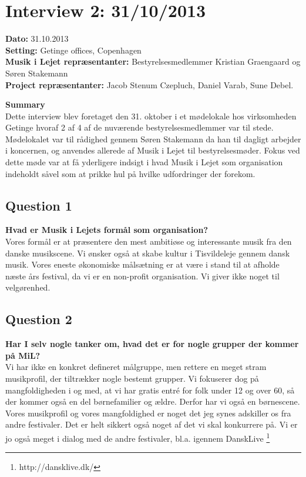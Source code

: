 \section{Interview 2: 31/10/2013}
\label{interview_2}

\textbf{Dato:} 31.10.2013 \\
\textbf{Setting:} Getinge offices, Copenhagen \\
\textbf{Musik i Lejet repræsentanter:} Bestyrelsesmedlemmer Kristian Graengaard og Søren Stakemann \\
\textbf{Project repræsentanter:} Jacob Stenum Czepluch, Daniel Varab, Sune Debel.

\bigskip

\noindent \textbf{Summary} \\
Dette interview blev foretaget den 31. oktober i et mødelokale hos virksomheden Getinge hvoraf 2 af 4 af de nuværende bestyrelsesmedlemmer var til stede. Mødelokalet var til rådighed gennem Søren Stakemann da han til dagligt arbejder i koncernen, og anvendes allerede af Musik i Lejet til bestyrelsesmøder. Fokus ved dette møde var at få yderligere indsigt i hvad Musik i Lejet som organisation indeholdt såvel som at prikke hul på hvilke udfordringer der forekom.


\subsection{Question 1}
\label{i2q1}
\noindent \textbf{Hvad er Musik i Lejets formål som organisation?} \\
Vores formål er at præsentere den mest ambitiøse og interessante musik fra den danske musikscene. Vi ønsker også at skabe kultur i Tisvildeleje gennem dansk musik. Vores eneste økonomiske målsætning er at være i stand til at afholde næste års festival, da vi er en non-profit organisation. Vi giver ikke noget til velgørenhed. 

\subsection{Question 2}
\label{i2q2}
\noindent \textbf{Har I selv nogle tanker om, hvad det er for nogle grupper der kommer på MiL?} \\
Vi har ikke en konkret defineret målgruppe, men rettere en  meget stram musikprofil, der tiltrækker nogle bestemt grupper. Vi fokuserer dog på mangfoldigheden i og med, at vi har gratis entré for folk under 12 og over 60, så der kommer også en del børnefamilier og ældre. Derfor har vi også en børnescene. Vores musikprofil og vores mangfoldighed er noget det jeg synes adskiller os fra andre festivaler. Det er helt sikkert også noget af det vi skal konkurrere på. Vi er jo også meget i dialog med de andre festivaler, bl.a. igennem DanskLive \footnote{http://dansklive.dk/}


